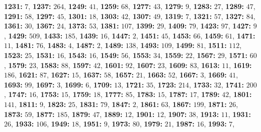 \textsf{\bfseries 1231:} $7$, \textsf{\bfseries 1237:} $264$, \textsf{\bfseries 1249:} $41$, \textsf{\bfseries 1259:} $68$, \textsf{\bfseries 1277:} $43$, \textsf{\bfseries 1279:} $9$, \textsf{\bfseries 1283:} $27$, \textsf{\bfseries 1289:} $47$, \textsf{\bfseries 1291:} $58$, \textsf{\bfseries 1297:} $45$, \textsf{\bfseries 1301:} $18$, \textsf{\bfseries 1303:} $42$, \textsf{\bfseries 1307:} $49$, \textsf{\bfseries 1319:} $7$, \textsf{\bfseries 1321:} $57$, \textsf{\bfseries 1327:} $84$, \textsf{\bfseries 1361:} $30$, \textsf{\bfseries 1367:} $24$, \textsf{\bfseries 1373:} $53$, \textsf{\bfseries 1381:} $107$, \textsf{\bfseries 1399:} $29$, \textsf{\bfseries 1409:} $79$, \textsf{\bfseries 1423:} $97$, \textsf{\bfseries 1427:} $9$, \textsf{\bfseries 1429:} $509$, \textsf{\bfseries 1433:} $185$, \textsf{\bfseries 1439:} $16$, \textsf{\bfseries 1447:} $2$, \textsf{\bfseries 1451:} $45$, \textsf{\bfseries 1453:} $66$, \textsf{\bfseries 1459:} $61$, \textsf{\bfseries 1471:} $11$, \textsf{\bfseries 1481:} $76$, \textsf{\bfseries 1483:} $4$, \textsf{\bfseries 1487:} $2$, \textsf{\bfseries 1489:} $138$, \textsf{\bfseries 1493:} $109$, \textsf{\bfseries 1499:} $81$, \textsf{\bfseries 1511:} $112$, \textsf{\bfseries 1523:} $25$, \textsf{\bfseries 1531:} $16$, \textsf{\bfseries 1543:} $16$, \textsf{\bfseries 1549:} $56$, \textsf{\bfseries 1553:} $34$, \textsf{\bfseries 1559:} $22$, \textsf{\bfseries 1567:} $29$, \textsf{\bfseries 1571:} $60$, \textsf{\bfseries 1579:} $23$, \textsf{\bfseries 1583:} $88$, \textsf{\bfseries 1597:} $42$, \textsf{\bfseries 1601:} $92$, \textsf{\bfseries 1607:} $23$, \textsf{\bfseries 1609:} $83$, \textsf{\bfseries 1613:} $11$, \textsf{\bfseries 1619:} $186$, \textsf{\bfseries 1621:} $87$, \textsf{\bfseries 1627:} $15$, \textsf{\bfseries 1637:} $58$, \textsf{\bfseries 1657:} $21$, \textsf{\bfseries 1663:} $52$, \textsf{\bfseries 1667:} $3$, \textsf{\bfseries 1669:} $41$, \textsf{\bfseries 1693:} $99$, \textsf{\bfseries 1697:} $3$, \textsf{\bfseries 1699:} $6$, \textsf{\bfseries 1709:} $13$, \textsf{\bfseries 1721:} $35$, \textsf{\bfseries 1723:} $214$, \textsf{\bfseries 1733:} $32$, \textsf{\bfseries 1741:} $200$, \textsf{\bfseries 1747:} $16$, \textsf{\bfseries 1753:} $15$, \textsf{\bfseries 1759:} $18$, \textsf{\bfseries 1777:} $85$, \textsf{\bfseries 1783:} $15$, \textsf{\bfseries 1787:} $17$, \textsf{\bfseries 1789:} $42$, \textsf{\bfseries 1801:} $141$, \textsf{\bfseries 1811:} $9$, \textsf{\bfseries 1823:} $25$, \textsf{\bfseries 1831:} $79$, \textsf{\bfseries 1847:} $2$, \textsf{\bfseries 1861:} $63$, \textsf{\bfseries 1867:} $199$, \textsf{\bfseries 1871:} $26$, \textsf{\bfseries 1873:} $59$, \textsf{\bfseries 1877:} $185$, \textsf{\bfseries 1879:} $47$, \textsf{\bfseries 1889:} $12$, \textsf{\bfseries 1901:} $12$, \textsf{\bfseries 1907:} $38$, \textsf{\bfseries 1913:} $11$, \textsf{\bfseries 1931:} $26$, \textsf{\bfseries 1933:} $106$, \textsf{\bfseries 1949:} $18$, \textsf{\bfseries 1951:} $9$, \textsf{\bfseries 1973:} $80$, \textsf{\bfseries 1979:} $21$, \textsf{\bfseries 1987:} $16$, \textsf{\bfseries 1993:} $7$, 
